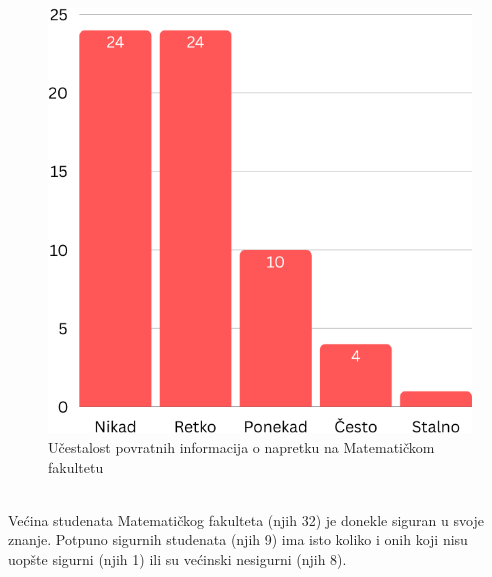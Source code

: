 \documentclass[a4paper]{article}
\begin{document}
{\begin{figure}[h!]
\begin{center}
    \includegraphics[scale = 0.3]{PovratneInformacijeMatf.png}
    \caption{Učestalost povratnih informacija o napretku na Matematičkom fakultetu}
    \label{fig:povratne_informacije_matf}
\end{center}
\end{figure}
\\Većina studenata Matematičkog fakulteta (njih 32) je donekle siguran u svoje znanje. Potpuno sigurnih studenata (njih 9) ima isto koliko i onih koji nisu uopšte sigurni (njih 1) ili su većinski nesigurni (njih 8).\\
\begin{figure}[h!]
\begin{center}

\end{center}
\end{figure}}
\end{document}
